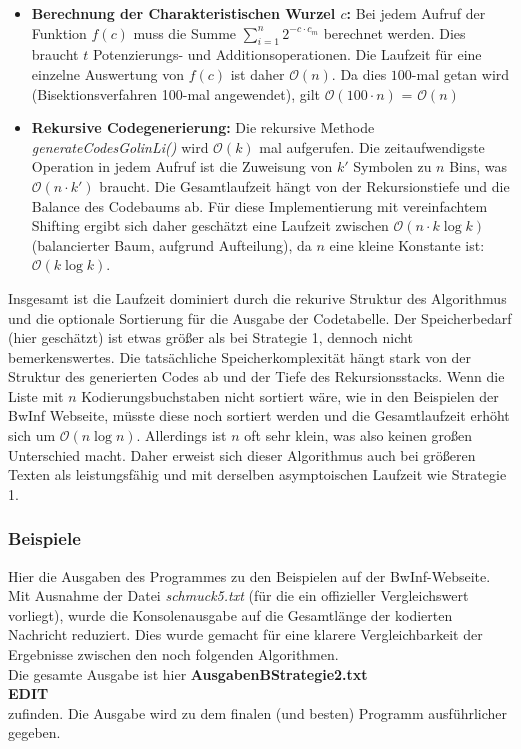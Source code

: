 \documentclass[a4paper,10pt,ngerman]{scrartcl}
\begin{document}
\begin{itemize}
  \item \textbf{Berechnung der Charakteristischen Wurzel $c$:} Bei jedem Aufruf der Funktion $f(c)$ muss die Summe $\sum_{i=1}^{n} 2^{-c \cdot c_{m}}$ berechnet werden. Dies braucht $t$ Potenzierungs- und Additionsoperationen. Die Laufzeit für eine einzelne Auswertung von $f(c)$ ist daher $\mathcal{O}(n)$. Da dies $100$-mal getan wird (Bisektionsverfahren 100-mal angewendet), gilt $\mathcal{O}(100 \cdot n)$ = $\mathcal{O}(n)$ 
  
  \item \textbf{Rekursive Codegenerierung:} Die rekursive Methode \textit{generateCodesGolinLi()} wird $\mathcal{O}(k)$ mal aufgerufen. Die zeitaufwendigste Operation in jedem Aufruf ist die Zuweisung von $k'$ Symbolen zu $n$ Bins, was $\mathcal{O}(n \cdot k')$ braucht. Die Gesamtlaufzeit hängt von der Rekursionstiefe und die Balance des Codebaums ab. Für diese Implementierung mit vereinfachtem Shifting ergibt sich daher geschätzt eine Laufzeit zwischen $\mathcal{O}(n \cdot k \log k)$ (balancierter Baum, aufgrund Aufteilung), da $n$ eine kleine Konstante ist: $\mathcal{O}(k \log k)$.

\end{itemize}

\vspace{1em}
Insgesamt ist die Laufzeit dominiert durch die rekurive Struktur des Algorithmus und die optionale Sortierung für die Ausgabe der Codetabelle. Der Speicherbedarf (hier geschätzt) ist etwas größer als bei Strategie 1, dennoch nicht bemerkenswertes. Die tatsächliche Speicherkomplexität hängt stark von der Struktur des generierten Codes ab und der Tiefe des Rekursionsstacks.
\newline
Wenn die Liste mit $n$ Kodierungsbuchstaben nicht sortiert wäre, wie in den Beispielen der BwInf Webseite, müsste diese noch sortiert werden und die Gesamtlaufzeit erhöht sich um $\mathcal{O}(n \log n)$. Allerdings ist $n$ oft sehr klein, was also keinen großen Unterschied macht.
Daher erweist sich dieser Algorithmus auch bei größeren Texten als leistungsfähig und mit derselben asymptoischen Laufzeit wie Strategie 1.

\subsubsection{Beispiele}
Hier die Ausgaben des Programmes zu den Beispielen auf der BwInf-Webseite. Mit Ausnahme der Datei \textit{schmuck5.txt} (für die ein offizieller Vergleichswert vorliegt), wurde die Konsolenausgabe auf die Gesamtlänge der kodierten Nachricht reduziert. Dies wurde gemacht für eine klarere Vergleichbarkeit der Ergebnisse zwischen den noch folgenden Algorithmen. \\Die gesamte Ausgabe ist hier \textbf{AusgabenBStrategie2.txt} \\ \newline \textbf{EDIT} \\ \newline zufinden. 
Die Ausgabe wird zu dem finalen (und besten) Programm ausführlicher gegeben. 
\end{document}
